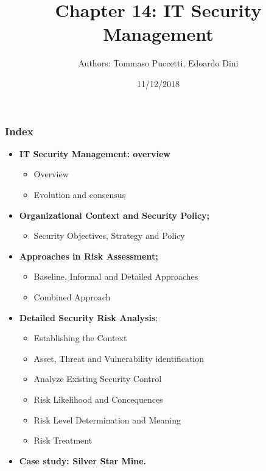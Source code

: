 \documentclass[xcolor ={table,usenames,dvipsnames}]{beamer}
\title{Chapter 14: IT Security Management}
\author{Authors: Tommaso Puccetti, Edoardo Dini}
\institute{Universit\`a  degli Studi di Firenze}
\date{11/12/2018}
\theoremstyle{definition}
\begin{document}
	
	\begin{frame}
		\maketitle
	\end{frame}
	
		\begin{frame}
		\frametitle{Index}
		\begin{itemize}
			\item  \textbf{IT Security Management: overview}
			\begin{itemize}
				\item Overview
				\item Evolution and consensus
			\end{itemize}
			\item   \textbf{Organizational Context and Security Policy;}
			\begin{itemize}
				\item Security Objectives, Strategy and Policy
			\end{itemize}
			\item   \textbf{Approaches in Risk Assessment;}
			\begin{itemize}
				\item Baseline, Informal and Detailed Approaches
				\item Combined Approach
			\end{itemize}
			\item  \textbf{Detailed Security Risk Analysis};
			\begin{itemize}
				\item Establishing the Context
				\item Asset, Threat and Vulnerability identification
				\item Analyze Existing Security Control
				\item Risk Likelihood and Concequences
				\item Risk Level Determination and Meaning
				\item Risk Treatment
			\end{itemize}
			\item  \textbf{Case study: Silver Star Mine.}
		\end{itemize}
	\end{frame}
		
\end{document}
